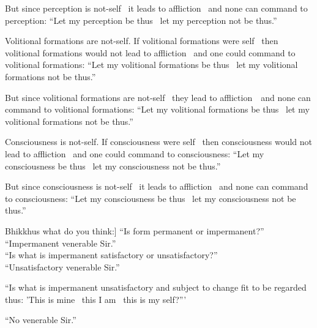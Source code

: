 \begin{english-only-hang}
But since perception is not-self \breathmark\ it leads to affliction \breathmark\ and none can command to perception: ``Let my perception be thus \breathmark\ let my perception not be thus.''
\end{english-only-hang}

\begin{english-only-hang}
Volitional formations are not-self. If volitional formations were self \breathmark\ then volitional formations would not lead to affliction \breathmark\ and one could command to volitional formations: ``Let my volitional formations be thus \breathmark\ let my volitional formations not be thus.''
\end{english-only-hang}

\begin{english-only-hang}
But since volitional formations are not-self \breathmark\ they lead to \mbox{affliction}~\breathmark\ and none can command to volitional formations: ``Let my volitional formations be thus \breathmark\ let my volitional formations not be thus.''
\end{english-only-hang}

\begin{english-only-hang}
Consciousness is not-self. If consciousness were self \breathmark\ then consciousness would not lead to affliction \breathmark\ and one could command to consciousness: ``Let my consciousness be thus \breathmark\ let my consciousness not be thus.''
\end{english-only-hang}

\begin{english-only-hang}
But since consciousness is not-self \breathmark\ it leads to affliction \breathmark\ and none can command to consciousness: ``Let my consciousness be thus \breathmark\ let my consciousness not be thus.''
\end{english-only-hang}
\begin{english-only-nohang}
Bhikkhus what do you think:] ``Is form permanent or impermanent?''\\

``Impermanent venerable Sir.''\\

``Is what is impermanent satisfactory or unsatisfactory?''\\

``Unsatisfactory venerable Sir.''\\

\begin{english-hangtogether}
``Is what is impermanent unsatisfactory and subject to change fit to be regarded thus: 'This is mine \breathmark\ this I am \breathmark\ this is my self?'''
\end{english-hangtogether}

``No venerable Sir.''
\end{english-only-nohang}

